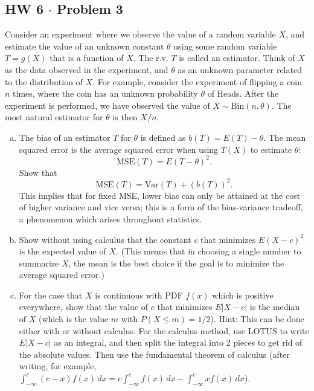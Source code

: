 \documentclass[11pt,a4paper]{article}
\begin{document}
\vspace{10pt}
\subsection{HW 6 $\cdot$ Problem 3}
\begin{tcolorbox}[title={HW 6 $\cdot$ Problem 3}]
Consider an experiment where we observe the value of a random variable $X$, and estimate the value of an unknown constant $\theta$ using some random variable $T = g(X)$ that is a function of $X$. The r.v. $T$ is called an estimator. Think of $X$ as the data observed in the experiment, and $\theta$ as an unknown parameter related to the distribution of $X$.
For example, consider the experiment of flipping a coin $n$ times, where the coin has an unknown probability $\theta$ of Heads. After the experiment is performed, we have observed the value of $X \sim \text{Bin}(n, \theta)$. The most natural estimator for $\theta$ is then $X/n$.
\begin{enumerate}[(a)]
\item The bias of an estimator $T$ for $\theta$ is defined as $b(T) = E(T) - \theta$. The mean squared error is the average squared error when using $T(X)$ to estimate $\theta$:
\[
\text{MSE}(T) = E(T - \theta)^2.
\]
Show that
\[
\text{MSE}(T) = \text{Var}(T) + (b(T))^2.
\]
This implies that for fixed MSE, lower bias can only be attained at the cost of higher variance and vice versa; this is a form of the bias-variance tradeoff, a phenomenon which arises throughout statistics.
\item Show without using calculus that the constant $c$ that minimizes $E(X - c)^2$ is the expected value of $X$. (This means that in choosing a single number to summarize $X$, the mean is the best choice if the goal is to minimize the average squared error.)
\item For the case that $X$ is continuous with PDF $f(x)$ which is positive everywhere, show that the value of $c$ that minimizes $E|X - c|$ is the median of $X$ (which is the value $m$ with $P(X \le m) = 1/2$).
Hint: This can be done either with or without calculus. For the calculus method, use LOTUS to write $E|X - c|$ as an integral, and then split the integral into 2 pieces to get rid of the absolute values. Then use the fundamental theorem of calculus (after writing, for example, $\int_{-\infty}^{c} (c - x) f(x) \, dx = c \int_{-\infty}^{c} f(x) \, dx - \int_{-\infty}^{c} x f(x) \, dx$).
\end{enumerate}
\end{tcolorbox}
\end{document}
